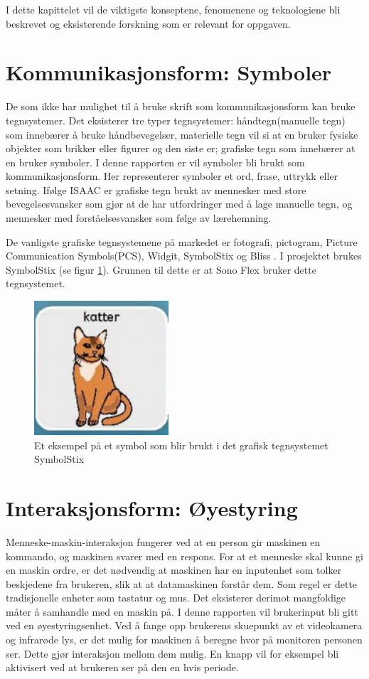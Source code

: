 \documentclass[phd,tocprelim]{cornell}
\begin{document}
I dette kapittelet vil de viktigste konseptene, fenomenene og teknologiene bli beskrevet og eksisterende  forskning som er relevant for oppgaven. 

\section{Kommunikasjonsform: Symboler}

De som ikke har mulighet til å bruke skrift som kommunikasjonsform kan bruke tegnsystemer. Det eksisterer tre typer tegnsystemer: håndtegn(manuelle tegn) som innebærer å bruke håndbevegelser, materielle tegn vil si at en bruker fysiske objekter som brikker eller figurer og den siste er; grafiske tegn som innebærer at en bruker symboler. I denne rapporten er vil symboler bli brukt som kommunikasjonsform. Her representerer symboler et ord, frase, uttrykk eller setning. Ifølge ISAAC \cite{Tegnsystemer} er grafiske tegn brukt av mennesker med store bevegelsesvansker som gjør at de har utfordringer med å lage manuelle tegn, og mennesker med forståelsesvansker som følge av lærehemning.

De vanligste grafiske tegnsystemene på markedet er fotografi, pictogram, Picture Communication Symbols(PCS), Widgit, SymbolStix og Bliss \cite{GrafiskTegn}. I prosjektet brukes SymbolStix (se figur \ref{fig:katt}). Grunnen til dette er at Sono Flex bruker dette tegnsystemet.


\begin{figure}[ht!]
\centering
\includegraphics[width=50mm]{katt}
\caption{Et eksempel på et symbol som blir brukt i det grafisk tegnsystemet SymbolStix}
\label{fig:katt}
\end{figure}

\section{Interaksjonsform: Øyestyring}

Menneske-maskin-interaksjon fungerer ved at en person gir maskinen en kommando, og maskinen svarer med en respons. For at et menneske skal kunne gi en maskin ordre, er det nødvendig at maskinen har en inputenhet som tolker beskjedene fra brukeren, slik at at datamaskinen forstår dem.  Som regel er dette tradisjonelle enheter som tastatur og mus. Det eksisterer derimot mangfoldige måter å samhandle med en maskin på. I denne rapporten vil brukerinput bli gitt ved en øyestyringsenhet.  Ved å fange opp brukerens skuepunkt av et videokamera og infrarøde lys, er det mulig for maskinen å beregne hvor på monitoren personen ser. Dette gjør interaksjon mellom dem mulig. En knapp vil for eksempel bli aktivisert ved at brukeren ser på den en hvis periode. 
\end{document}
